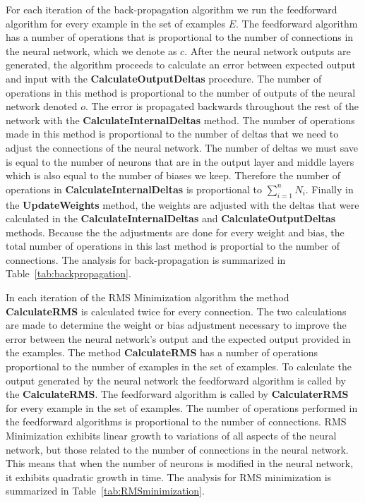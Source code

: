 \documentclass[11pt]{article}
\begin{document}
For each iteration of the back-propagation algorithm we run the feedforward algorithm for every example in the set of examples $E$. The
feedforward algorithm has a number of operations that is proportional to the number of connections in the neural network, which we
denote as $c$. After the neural network outputs are generated, the algorithm proceeds to calculate an error between expected output and
input with the \textbf{CalculateOutputDeltas} procedure. The number of operations in this method is proportional to the number of
outputs of the neural network denoted $o$. The error is propagated backwards throughout the rest of the network with the
\textbf{CalculateInternalDeltas} method. The number of operations made in this method is proportional to the number of deltas that we
need to adjust the connections of the neural network. The number of deltas we must save is equal to the number of neurons that are in
the output layer and middle layers which is also equal to the number of biases we keep. Therefore the number of operations in
\textbf{CalculateInternalDeltas} is proportional to $\sum_{i=1}^{n}N_{i}$. Finally in the \textbf{UpdateWeights} method, the weights are
adjusted with the deltas that were calculated in the \textbf{CalculateInternalDeltas} and \textbf{CalculateOutputDeltas} methods.
Because the the adjustments are done for every weight and bias, the total number of operations in this last method is proportial to the
number of connections. The analysis for back-propagation is summarized in Table~\ref{tab:backpropagation}.

In each iteration of the RMS Minimization algorithm the method \textbf{CalculateRMS} is calculated twice for every connection. The two
calculations are made to determine the weight or bias adjustment necessary to improve the error between the neural network's output and
the expected output provided in the examples. The method \textbf{CalculateRMS} has a number of operations proportional to the number of
examples in the set of examples. To calculate the output generated by the neural network the feedforward algorithm is called by the
\textbf{CalculateRMS}. The feedforward algorithm is called by \textbf{CalculaterRMS} for every example in the set of examples. The
number of operations performed in the feedforward algorithms is proportional to the number of connections. RMS Minimization exhibits
linear growth to variations of all aspects of the neural network, but those related to the number of connections in the neural network.
This means that when the number of neurons is modified in the neural network, it exhibits quadratic growth in time. The analysis for RMS
minimization is summarized in Table~\ref{tab:RMSminimization}.
\end{document}
